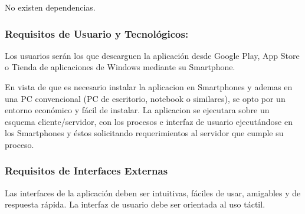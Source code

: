             
            No existen dependencias.
            
          \subsubsection{Requisitos de Usuario y Tecnológicos:}
        
            
            Los usuarios serán los que descarguen la aplicación desde Google Play, App Store o Tienda de aplicaciones de Windows mediante su Smartphone.
            
            
            En vista de que es necesario instalar la aplicacion en Smartphones y ademas en una PC convencional (PC de escritorio, notebook o similares), se opto por un entorno económico y fácil de instalar. La aplicacion se ejecutara sobre un esquema cliente/servidor, con los procesos e interfaz de usuario ejecutándose en los Smartphones y éstos solicitando requerimientos al servidor que cumple su proceso.
            
        \subsubsection{Requisitos de Interfaces Externas}
        
            
            Las interfaces de la aplicación deben ser intuitivas, fáciles de usar, amigables y de respuesta rápida. La interfaz de usuario debe ser orientada al uso táctil.
            
            

